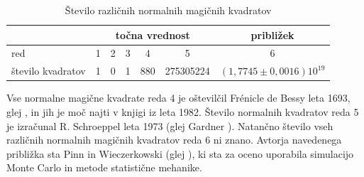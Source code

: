 \documentclass[a4paper,12pt]{article}
\begin{document}
\begin{table}[!ht]
   \centering
   \caption{Število različnih normalnih magičnih kvadratov}
   \begin{tabular}{lcccccc}\toprule
      & \multicolumn{5}{c}{točna vrednost} & približek \\
      \midrule red & 1 & 2 & 3 & 4 & 5 & 6 \\
      število kvadratov & 1 & 0 & 1 & 880 & 275305224 & \((1{,}7745\pm0{,}0016)10^19\) \\
      \bottomrule
   \end{tabular}
   \label{števila}
\end{table}

Vse normalne magične kvadrate reda 4 je oštevilčil Frénicle de Bessy
leta 1693, glej \cite{bessy}, in jih je moč najti v knjigi \cite{berlekamp}
iz leta 1982. Število normalnih kvadratov reda 5 je izračunal
R. Schroeppel leta 1973 (glej Gardner \cite{gardner}).
Natančno število vseh različnih normalnih magičnih kvadratov reda 6 ni znano.
Avtorja navedenega približka sta Pinn in Wieczerkowski (glej \cite{pinn}), ki
sta za oceno uporabila simulacijo Monte Carlo in metode statistične mehanike.


\newpage




\end{document}
